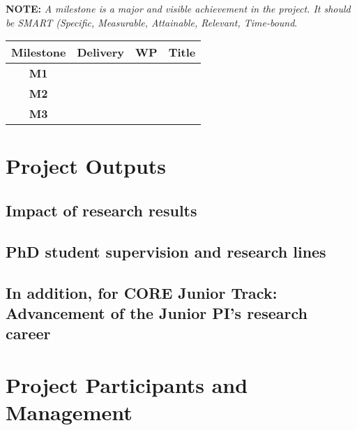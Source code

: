 \documentclass[11pt,twoside,a4paper]{article}
\begin{document}
\textbf{NOTE:} \emph{A milestone is a major and visible achievement in the
  project. It should be SMART (Specific, Measurable, Attainable, Relevant,
  Time-bound}.  

\begin{table}[H]
    \centering
    \begin{tabular}{|c||c|c|p{}|}
        \hline
        \rowcolor{lightgray}
        \textbf{Milestone} & \textbf{Delivery} & \textbf{WP} & \textbf{Title}\\\hline
        \hline
        \textbf{M1}     & & &  \\\hline
        \textbf{M2}     & & &  \\\hline
        \textbf{M3}     & & &  \\\hline
    \end{tabular}
\end{table}


\section{Project Outputs}

\subsection{Impact of research results}


\subsection{PhD student supervision and research lines}


\subsection{{\small In addition, for CORE Junior Track:}\newline
  Advancement of the Junior PI's research career}


\section{Project Participants and Management}
\end{document}
